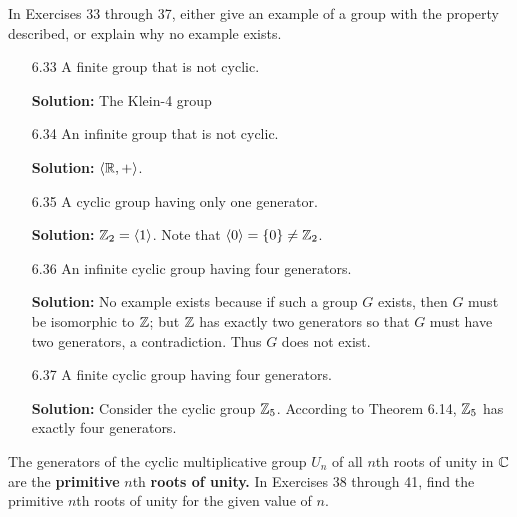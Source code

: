 \noindent      In Exercises 33 through 37, either give an example of a group
               with the property described, or explain why no example exists.

\begin{enumerate}
   \item[6.33] A finite group that is not cyclic.

      \textbf{Solution:} The Klein-4 group
   \item[6.34] An infinite group that is not cyclic.

      \textbf{Solution:} $\langle \mathbb{R}, + \rangle$.
   \item[6.35] A cyclic group having only one generator.

      \textbf{Solution:} $\mathbb{Z}_2 = \langle 1 \rangle$. Note that
      $\langle 0 \rangle = \{0\} \neq \mathbb{Z}_2$.
   \item[6.36] An infinite cyclic group having four generators.

      \textbf{Solution:} No example exists because if such a group $G$ exists,
      then $G$ must be isomorphic to $\mathbb{Z}$; but $\mathbb{Z}$ has exactly two generators
      so that $G$ must have two generators, a contradiction. Thus $G$ does not
      exist.
   \item[6.37] A finite cyclic group having four generators.

      \textbf{Solution:} Consider the cyclic group $\mathbb{Z}_5$. According to Theorem
      6.14, $\mathbb{Z}_5$ has exactly four generators.
\end{enumerate}

\noindent      The generators of the cyclic multiplicative group $U_n$ of all
               $n$th roots of unity in $\mathbb{C}$ are the \textbf{primitive} $n$th
               \textbf{roots of unity.} In Exercises 38 through 41, find the
               primitive $n$th roots of unity for the given value of $n$.

